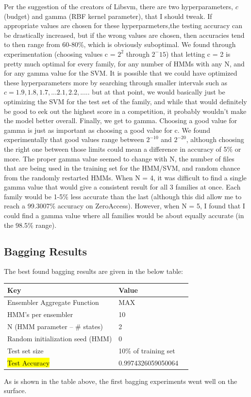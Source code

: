 \documentclass[12pt]{article}
\begin{document}
  Per the suggestion of the creators of Libsvm, there are two hyperparameters, $c$ (budget) and gamma (RBF kernel parameter), that I should tweak. If appropriate values are chosen for these hyperparmeters,the testing accuracy can be drastically increased, but if the wrong values are chosen, then accuracies tend to then range from 60-80\%, which is obviously suboptimal.  We found through experimentation (choosing values c = $2^2$ through $2^-15$) that letting c = 2 is pretty much optimal for every family, for any number of HMMs with any N, and for any gamma value for the SVM. It is possible that we could have optimized these hyperparameters more by searching through smaller intervals such as $c = 1.9, 1.8, 1.7, ... 2.1, 2.2, .....$ but at that point, we would basically just be optimizing the SVM for the test set of the family, and while that would definitely be good to eek out the highest score in a competition, it probably wouldn't make the model better overall. Finally, we get to gamma. Choosing a good value for gamma is just as important as choosing a good value for c. We found experimentally that good values range between $2^{-10}$ and $2^{-20}$, although choosing the right one between those limits could mean a difference in accuracy of 5\% or more.
The proper gamma value seemed to change with N, the number of files that are being used in the training set for the HMM/SVM, and random chance from the randomly restarted HMMs. When N = 4, it was difficult to find a single gamma value that would give a consistent result for all 3 families at once. Each family would be 1-5\% less accurate than the last (although this did allow me to reach a 99.3007\% accuracy on ZeroAccess). However, when N = 5, I found that I could find a gamma value where all families would be about equally accurate (in the 98.5\% range). 

\subsection{Bagging Results}
  The best found bagging results are given in the below table:
  \begin{table}[H]
    \centering
  \begin{tabular}{|l|l|l|}
    \hline \textbf{Key} & \textbf{Value} \\\hline \hline
    Ensembler Aggregate Function & \textsc{MAX}  \\ \hline
    HMM's per ensembler & 10 \\ \hline
    N (HMM parameter -- \# states) & 2 \\ \hline
    Random initialization seed (HMM) & 0 \\ \hline
    Test set size  & 10\% of training set \\ \hline
  \hl{Test Accuracy} & 0.9974326059050064  \\ \hline
  \end{tabular}
  \end{table}  
  As is shown in the table above, the first bagging experiments went well on the surface. 
\end{document}
